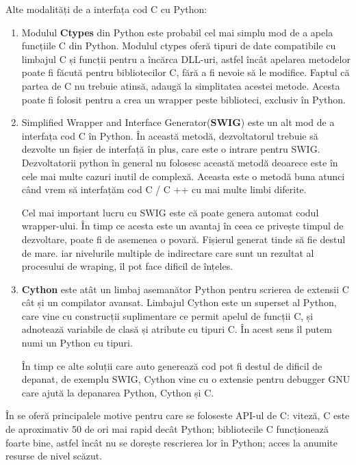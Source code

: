 Alte modalități de a interfața cod C cu Python: 

\begin{enumerate}
  \item Modulul \textbf{Ctypes} din Python este probabil cel mai simplu mod de a apela funcțiile C din Python. Modulul ctypes oferă tipuri de date compatibile cu limbajul C și funcții pentru a încărca DLL-uri, astfel încât apelarea metodelor poate fi făcută pentru bibliotecilor C, fără a fi nevoie să le modifice. Faptul că partea de C nu trebuie atinsă, adaugă la simplitatea acestei metode. Acesta poate fi folosit pentru a crea un wrapper peste biblioteci, exclusiv în Python.

  \item Simplified Wrapper and Interface Generator(\textbf{SWIG}) este un alt mod de a interfața cod C în Python. În această metodă, dezvoltatorul trebuie să dezvolte un fișier de interfață în plus, care este o intrare pentru SWIG. Dezvoltatorii python în general nu folosesc această metodă deoarece este în cele mai multe cazuri inutil de complexă. Aceasta este o metodă buna atunci când vrem să interfațăm cod C / C ++ cu mai multe limbi diferite.
  
Cel mai important lucru cu SWIG este că poate genera automat codul wrapper-ului. În timp ce acesta este un avantaj în ceea ce privește timpul de dezvoltare, poate fi de asemenea o povară. Fișierul generat tinde să fie destul de mare. iar nivelurile multiple de indirectare care sunt un rezultat al procesului de wraping, îl pot face dificil de înțeles.

  \item \textbf{Cython} este atât un limbaj asemanător Python pentru scrierea de extensii C cât și un compilator avansat. Limbajul Cython este un superset al Python, care vine cu construcții suplimentare ce permit apelul de funcții C, și adnotează variabile de clasă și atribute cu tipuri C. În acest sens îl putem numi un Python cu tipuri.
  
În timp ce alte soluții care auto generează cod pot fi destul de dificil de depanat, de exemplu SWIG, Cython vine cu o extensie pentru debugger GNU care ajută la depanarea Python, Cython și C.
\end{enumerate}


În \cite{} se oferă principalele motive pentru care se foloseste API-ul de C: viteză, C este de aproximativ 50 de ori mai rapid decât Python; bibliotecile C funcționează foarte bine, astfel încât nu se dorește rescrierea lor în Python; acces la anumite resurse de nivel scăzut.

